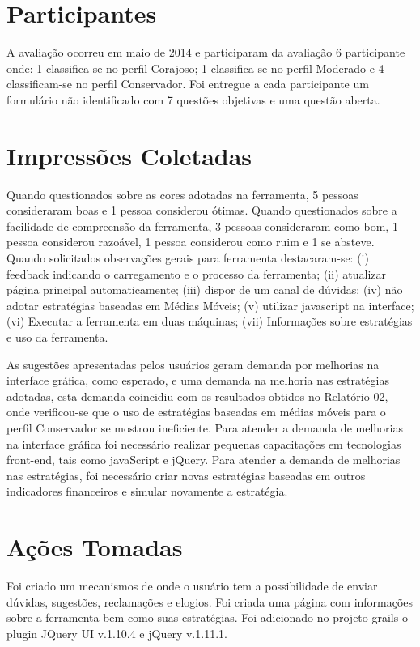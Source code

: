 \begin{apendicesenv}
\section{Participantes}
A avaliação ocorreu em maio de 2014 e participaram da avaliação 6 participante onde: 1 classifica-se no perfil Corajoso; 1 classifica-se no perfil Moderado e 4 classificam-se no perfil Conservador. Foi entregue a cada participante um formulário não identificado com 7 questões objetivas e uma questão aberta. 

\section{Impressões Coletadas}
Quando questionados sobre as cores adotadas na ferramenta, 5 pessoas consideraram boas e 1 pessoa considerou ótimas. Quando questionados sobre a facilidade de compreensão da ferramenta, 3 pessoas consideraram como bom, 1 pessoa considerou razoável, 1 pessoa considerou como ruim e 1 se absteve. Quando solicitados observações gerais para ferramenta destacaram-se: (i) feedback indicando o carregamento e o processo da ferramenta; (ii) atualizar página principal automaticamente; (iii) dispor de um canal de dúvidas; (iv) não adotar estratégias baseadas em Médias Móveis; (v) utilizar javascript na interface; (vi) Executar a ferramenta em duas máquinas; (vii) Informações sobre estratégias e uso da ferramenta.

As sugestões apresentadas pelos usuários geram demanda por melhorias na interface gráfica, como esperado, e uma demanda na melhoria nas estratégias adotadas, esta demanda coincidiu com os resultados obtidos no Relatório 02, onde verificou-se que o uso de estratégias baseadas em médias móveis para o perfil Conservador se mostrou ineficiente. Para atender a demanda de melhorias na interface gráfica foi necessário realizar pequenas capacitações em tecnologias front-end, tais como javaScript e jQuery. Para atender a demanda de melhorias nas estratégias, foi necessário criar novas estratégias baseadas em outros indicadores financeiros e simular novamente a estratégia.

\section{Ações Tomadas} 
Foi criado um mecanismos de onde o usuário tem a possibilidade de enviar dúvidas, sugestões, reclamações e elogios. Foi criada uma página com informações sobre a ferramenta bem como suas estratégias. Foi adicionado no projeto grails o plugin JQuery UI v.1.10.4 e jQuery v.1.11.1. 


\end{apendicesenv}
